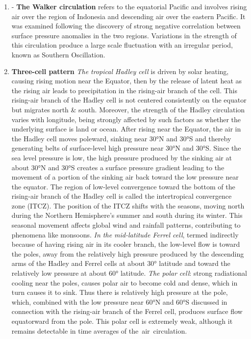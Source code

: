 \begin{enumerate}
    \item - \textbf{The Walker circulation} refers to the equatorial Pacific and involves rising air over the region of Indonesia and descending air over the eastern Pacific. It was examined following the discovery of strong negative correlation between surface pressure anomalies in the two regions. 
    Variations in the strength of this circulation produce a large scale fluctuation with an irregular period, known as Southern Oscillation. 

 \item \textbf{Three-cell pattern}
\newline \textit{The tropical Hadley cell} is driven by solar heating, causing rising motion near the Equator, then by the release of latent heat as the rising air leads to precipitation in the rising-air branch of the cell. This rising-air branch of the Hadley cell is not centered consistently on the equator but migrates north \& south.               
Moreover, the strength of the Hadley circulation varies with longitude, being strongly affected by such factors as whether the underlying surface is land or ocean. After rising near the Equator, the air in the Hadley cell moves poleward, sinking near 30°N and 30°S and thereby generating belts of surface-level high pressure near 30°N and 30°S. Since the sea level pressure is low, the high pressure produced by the sinking air at about 30°N and 30°S creates a surface pressure gradient leading to the movement of a portion of the sinking air back toward the low pressure near the equator. The region of low-level convergence toward the bottom of the rising-air branch of the Hadley cell is called the intertropical convergence zone (ITCZ). The position of the ITCZ shifts with the seasons, moving north during the Northern Hemisphere’s summer and south during its winter. This seasonal movement affects global wind and rainfall patterns, contributing to phenomena like monsoons.                         
\newline \textit{In the mid-latitude Ferrel cell}, termed indirectly because of having rising air in its cooler branch, the low-level flow is toward the poles, away from the relatively high pressure produced by the descending arms of the Hadley and Ferrel cells at about 30° latitude and toward the relatively low pressure at about 60° latitude. 
\newline \textit{The polar cell}: strong radiational cooling near the poles, causes polar air to become cold and dense, which in turn causes it to sink. Thus there is relatively high pressure at the pole, which, combined with the low pressure near 60°N and 60°S discussed in connection with the rising-air branch of the Ferrel cell, produces surface flow equatorward from the pole. This polar cell is extremely weak, although it remains detectable in time averages of the air circulation. 

\end{enumerate}

